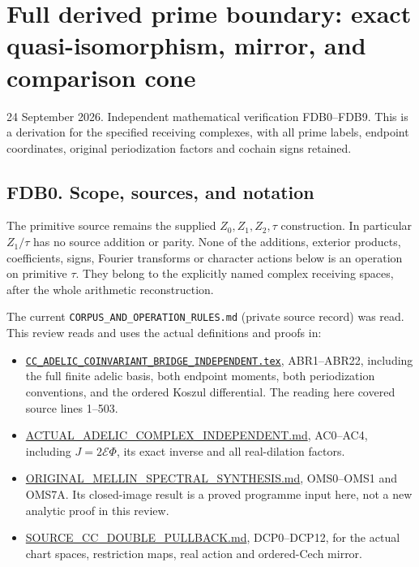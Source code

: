 \section{Full derived prime boundary: exact quasi-isomorphism, mirror,
and comparison
cone}\label{full-derived-prime-boundary-exact-quasi-isomorphism-mirror-and-comparison-cone}

24 September 2026. Independent mathematical verification FDB0--FDB9.
This is a derivation for the specified receiving complexes, with all
prime labels, endpoint coordinates, original periodization factors and
cochain signs retained.

\subsection{FDB0. Scope, sources, and
notation}\label{fdb0.-scope-sources-and-notation}

The primitive source remains the supplied \(Z_0,Z_1,Z_2,\tau\)
construction. In particular \(Z_1/\tau\) has no source addition or
parity. None of the additions, exterior products, coefficients, signs,
Fourier transforms or character actions below is an operation on
primitive \(\tau\). They belong to the explicitly named complex
receiving spaces, after the whole arithmetic reconstruction.

The current \nolinkurl{CORPUS_AND_OPERATION_RULES.md} (private source record) was read. This review
reads and uses the actual definitions and proofs in:

\begin{itemize}
\tightlist
\item
  \href{../independent/CC_ADELIC_COINVARIANT_BRIDGE_INDEPENDENT.tex}{\nolinkurl{CC_ADELIC_COINVARIANT_BRIDGE_INDEPENDENT.tex}},
  ABR1--ABR22, including the full finite adelic basis, both endpoint
  moments, both periodization conventions, and the ordered Koszul
  differential. The reading here covered source lines 1--503.
\item
  \url{ACTUAL_ADELIC_COMPLEX_INDEPENDENT.md}, AC0--AC4, including
  \(J=2\mathcal E\Phi\), its exact inverse and all real-dilation
  factors.
\item
  \url{ORIGINAL_MELLIN_SPECTRAL_SYNTHESIS.md}, OMS0--OMS1 and OMS7A. Its
  closed-image result is a proved programme input here, not a new
  analytic proof in this review.
\item
  \url{SOURCE_CC_DOUBLE_PULLBACK.md}, DCP0--DCP12, for the actual chart
  spaces, restriction maps, real action and ordered-Cech mirror.
\end{itemize}

